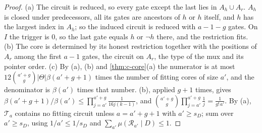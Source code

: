 \begin{proof}
(a) The circuit is reduced, so every gate except the last lies in $A_h\cup A_r$. $A_h$ is closed under
predecessors, all its gates are ancestors of $h$ or $h$ itself, and $h$ has the largest index in $A_h$; so the
induced circuit is reduced with $a-1-g$ gates. On $I$ the trigger is $0$, so the last gate equals $h$ or
$\neg h$ there, and the restriction fits. (b) The core is determined by its honest restriction together with
the positions of $A_r$ among the first $a-1$ gates, the circuit on $A_r$, the type of the mux and its pointer
order. (c) By (a), (b) and \cref{thm:c-core}(a) the numerator is at most
$12\binom{a'+g}{g}|\Theta|\beta(a'+g+1)$ times the number of fitting cores of size $a'$, and the denominator
is $\beta(a')$ times that number. (b), applied $g+1$ times, gives
$\beta(a'+g+1)/\beta(a')\le\prod_{j=a'}^{a'+g}\frac1{16j(k-1)}$, and
$\binom{a'+g}{g}\prod_{j=a'}^{a'+g}\frac1j=\frac1{g!\,a'}$. By (a), $\mathcal T_a$ contains no fitting circuit
unless $a=a'+g+1$ with $a'\ge s_D$; sum over $a'\ge s_D$, using $1/a'\le1/s_D$ and
$\sum_{a'}\mu(\mathcal R_{a'}\mid D)\le1$.
\end{proof}

